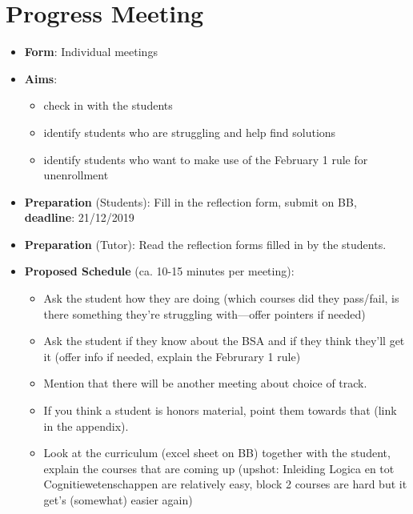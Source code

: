 \section{Progress Meeting}

	\begin{itemize}

		\item \textbf{Form}: Individual meetings

		\item \textbf{Aims}:

		\begin{itemize}

			\item check in with the students

			\item identify students who are struggling and help find solutions

			\item identify students who want to make use of the February 1 rule for unenrollment

		\end{itemize}

		\item \textbf{Preparation} (Students): Fill in the reflection form, submit on BB, \textbf{deadline}: 21/12/2019

		\item \textbf{Preparation} (Tutor): Read the reflection forms filled in by the students.

		\item \textbf{Proposed Schedule} (ca. 10-15 minutes per meeting):

		\begin{itemize}

			\item Ask the student how they are doing (which courses did they pass/fail, is there something they're struggling with---offer pointers if needed)

			\item Ask the student if they know about the BSA and if they think they'll get it (offer info if needed, explain the Februrary 1 rule)

			\item Mention that there will be another meeting about choice of track.

			\item If you think a student is honors material, point them towards that (link in the appendix).

			\item Look at the curriculum (excel sheet on BB) together with the student, explain the courses that are coming up (upshot: Inleiding Logica en tot Cognitiewetenschappen are relatively easy, block 2 courses are hard but it get's (somewhat) easier again)


\end{itemize}
\end{itemize}
